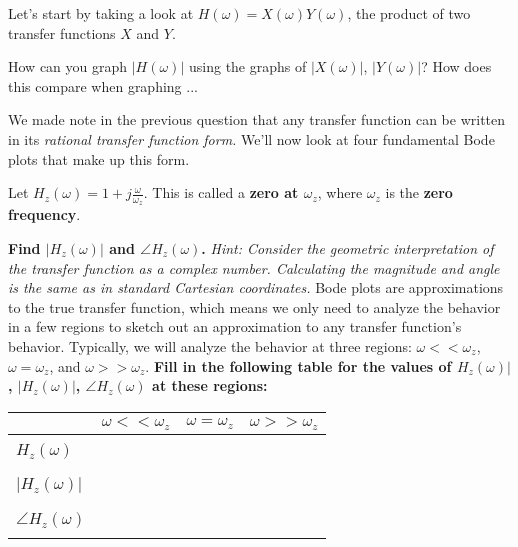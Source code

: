 \begin{enumerate}

\qitem Let's start by taking a look at $H(\omega) = X(\omega)Y(\omega)$, the product of two transfer functions $X$ and $Y$.
\begin{enumerate}
    \qitem How can you graph $|H(\omega)|$ using the graphs of $|X(\omega)|$, $|Y(\omega)|$?
    \qitem How does this compare when graphing ...
\end{enumerate}

\sol{
}

We made note in the previous question that any transfer function can be written in its \textit{rational transfer function form.}
We'll now look at four fundamental Bode plots that make up this form.

\qitem Let $H_z(\omega) = 1 + j \frac{\omega}{\omega_z}$. This is called a \textbf{zero at $\omega_z$}, where $\omega_z$ is the \textbf{zero frequency}.
\begin{enumerate}
    \qitem \textbf{Find $|H_z(\omega)|$ and $\angle H_z(\omega)$.}
           \textit{Hint: Consider the geometric interpretation of the transfer function as a complex number.
           Calculating the magnitude and angle is the same as in standard Cartesian coordinates.}
    \qitem Bode plots are approximations to the true transfer function, which means we only need to analyze the behavior in a few regions to sketch out an approximation to any transfer function's behavior.
    Typically, we will analyze the behavior at three regions: $\omega << \omega_z$, $\omega = \omega_z$, and $\omega >> \omega_z$.
    \textbf{Fill in the following table for the values of $H_z(\omega)|$, $|H_z(\omega)|$, $\angle H_z(\omega)$ at these regions:}

    \begin{table}[ht!]
      \centering
      \begin{tabular}{| l | >{\centering\arraybackslash}m{6em} | >{\centering\arraybackslash}m{6em} | >{\centering\arraybackslash}m{6em} |} 
      \cline{2-4}
      \multicolumn{1}{l|}{}& $\omega << \omega_z$ & $\omega = \omega_z$ & $\omega >> \omega_z$ \\
      \hline
      &&&\\
      $H_z(\omega)$        &                      &                     &                      \\
      &&&\\
      \hline
      &&&\\
      $|H_z(\omega)|$      &                      &                     &                      \\
      &&&\\
      \hline
      &&&\\
      $\angle H_z(\omega)$ &                      &                     &                      \\
      &&&\\
      \hline
      \end{tabular}
    \end{table}


\end{enumerate}
\end{enumerate}
